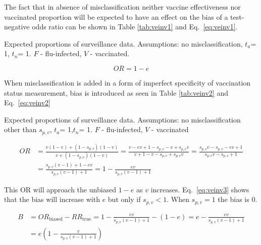 \documentclass[11pt]{article}
\begin{document}
The fact that in absence of misclassification neither vaccine effectiveness nor vaccinated proportion will be expected to have an effect on the bias of a test-negative odds ratio can be shown in Table \ref{tab:veinv1} and Eq.\ \ref{eq:veinv1}.

\begin{table}[h]
\centering
\caption{
Expected proportions of surveillance data.
Assumptions: no misclassification, $t_a$= 1, $t_n$= 1.
$F$ - flu-infected, $V$ - vaccinated.
 \label{tab:veinv1}
}
	
\end{table}

\begin{equation} \label{eq:veinv1}
OR = 1-e
\end{equation}

When misclassification is added in a form of imperfect specificity of vaccination status measurement, bias is introduced as seen in Table \ref{tab:veinv2} and Eq.\ \ref{eq:veinv2}

\begin{table}[h]
\centering
\caption{
Expected proportions of surveillance data. Assumptions: no misclassification other than $s_{p,v}$, $t_a$= 1,$t_n$= 1.
$F$ - flu-infected, $V$ - vaccinated
 \label{tab:veinv2}
}
	
\end{table}

\begin{equation} \label{eq:veinv2}
\begin{aligned}
OR &= \frac{v(1-e)+(1-s_{p,v})(1-v)}{v+(1-s_{p,v})(1-v)} =  \frac{v-ev+1-s_{p,v}-v+s_{p,v}v}{v+1-v-s_{p,v}+s_{p,v}v} =  
	\frac{s_{p,v}v-s_{p,v}-ev+1}{s_{p,v}v-s_{p,v}+1} \\
	&= \frac{s_{p,v}(v-1)+1-ev}{s_{p,v}(v-1)+1} = 1 - \frac{ev}{s_{p,v}(v-1)+1}
\end{aligned}
\end{equation}

This OR will approach the unbiased $1-e$ as $v$ increases. Eq.\ \ref{eq:veinv3} shows that the bias will increase with $e$ but only if $s_{p,v}<1$. When $s_{p,v}=1$ the bias is 0.

\begin{equation} \label{eq:veinv3}
\begin{aligned}
B &= OR_{\text{biased}} - RR_{\text{true}} = 1 - \frac{ev}{s_{p,v}(v-1)+1} - (1-e) = e - \frac{ev}{s_{p,v}(v-1)+1} \\
	&= e(1 - \frac{v}{s_{p,v}(v-1)+1})
\end{aligned}
\end{equation}
\end{document}
